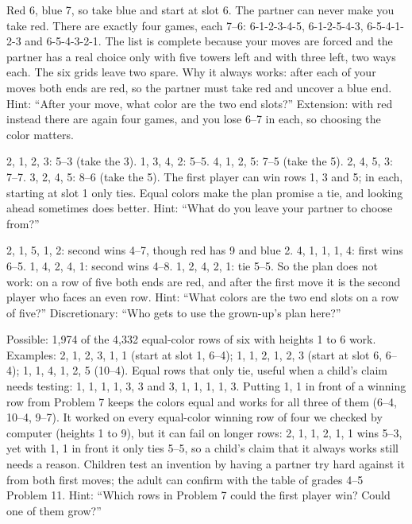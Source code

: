  Red 6, blue 7, so take blue and start at slot 6. The partner can never make you take red. There are exactly four games, each 7--6: 6-1-2-3-4-5, 6-1-2-5-4-3, 6-5-4-1-2-3 and 6-5-4-3-2-1. The list is complete because your moves are forced and the partner has a real choice only with five towers left and with three left, two ways each. The six grids leave two spare. Why it always works: after each of your moves both ends are red, so the partner must take red and uncover a blue end. Hint: ``After your move, what color are the two end slots?'' Extension: with red instead there are again four games, and you lose 6--7 in each, so choosing the color matters.

 2, 1, 2, 3: 5--3 (take the 3). 1, 3, 4, 2: 5--5. 4, 1, 2, 5: 7--5 (take the 5). 2, 4, 5, 3: 7--7. 3, 2, 4, 5: 8--6 (take the 5). The first player can win rows 1, 3 and 5; in each, starting at slot 1 only ties. Equal colors make the plan promise a tie, and looking ahead sometimes does better. Hint: ``What do you leave your partner to choose from?''

 2, 1, 5, 1, 2: second wins 4--7, though red has 9 and blue 2. 4, 1, 1, 1, 4: first wins 6--5. 1, 4, 2, 4, 1: second wins 4--8. 1, 2, 4, 2, 1: tie 5--5. So the plan does not work: on a row of five both ends are red, and after the first move it is the second player who faces an even row. Hint: ``What colors are the two end slots on a row of five?'' Discretionary: ``Who gets to use the grown-up's plan here?''

 Possible: 1,974 of the 4,332 equal-color rows of six with heights 1 to 6 work. Examples: 2, 1, 2, 3, 1, 1 (start at slot 1, 6--4); 1, 1, 2, 1, 2, 3 (start at slot 6, 6--4); 1, 1, 4, 1, 2, 5 (10--4). Equal rows that only tie, useful when a child's claim needs testing: 1, 1, 1, 1, 3, 3 and 3, 1, 1, 1, 1, 3. Putting 1, 1 in front of a winning row from Problem 7 keeps the colors equal and works for all three of them (6--4, 10--4, 9--7). It worked on every equal-color winning row of four we checked by computer (heights 1 to 9), but it can fail on longer rows: 2, 1, 1, 2, 1, 1 wins 5--3, yet with 1, 1 in front it only ties 5--5, so a child's claim that it always works still needs a reason. Children test an invention by having a partner try hard against it from both first moves; the adult can confirm with the table of grades 4--5 Problem 11. Hint: ``Which rows in Problem 7 could the first player win? Could one of them grow?''

